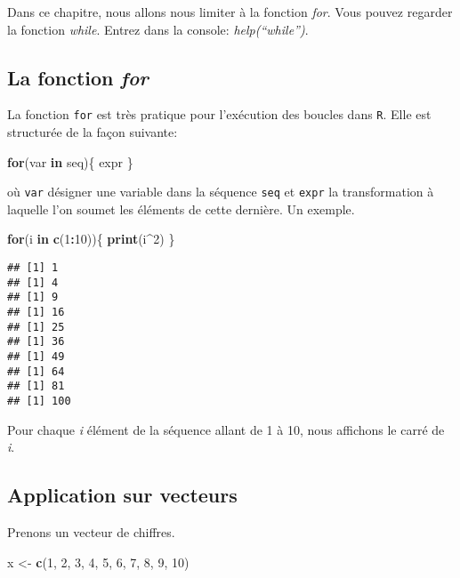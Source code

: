 \documentclass[]{book}
\newenvironment{Shaded}{\begin{snugshade}}{\end{snugshade}}
\newcommand{\KeywordTok}[1]{\textcolor[rgb]{0.13,0.29,0.53}{\textbf{#1}}}
\newcommand{\DecValTok}[1]{\textcolor[rgb]{0.00,0.00,0.81}{#1}}
\newcommand{\StringTok}[1]{\textcolor[rgb]{0.31,0.60,0.02}{#1}}
\newcommand{\ControlFlowTok}[1]{\textcolor[rgb]{0.13,0.29,0.53}{\textbf{#1}}}
\newcommand{\OperatorTok}[1]{\textcolor[rgb]{0.81,0.36,0.00}{\textbf{#1}}}
\newcommand{\NormalTok}[1]{#1}
\begin{document}
Dans ce chapitre, nous allons nous limiter à la fonction \emph{for}.
Vous pouvez regarder la fonction \emph{while}. Entrez dans la console:
\emph{help(``while'')}.

\subsection{\texorpdfstring{La fonction
\emph{for}}{La fonction for}}\label{la-fonction-for}

La fonction \texttt{for} est très pratique pour l'exécution des boucles
dans \texttt{R}. Elle est structurée de la façon suivante:

\begin{Shaded}
\begin{Highlighting}[]
\ControlFlowTok{for}\NormalTok{(var }\ControlFlowTok{in}\NormalTok{ seq)\{}
\NormalTok{  expr}
\NormalTok{\}}
\end{Highlighting}
\end{Shaded}

où \texttt{var} désigner une variable dans la séquence \texttt{seq} et
\texttt{expr} la transformation à laquelle l'on soumet les éléments de
cette dernière. Un exemple.

\begin{Shaded}
\begin{Highlighting}[]
\ControlFlowTok{for}\NormalTok{(i }\ControlFlowTok{in} \KeywordTok{c}\NormalTok{(}\DecValTok{1}\OperatorTok{:}\DecValTok{10}\NormalTok{))\{}
  \KeywordTok{print}\NormalTok{(i}\OperatorTok{^}\DecValTok{2}\NormalTok{)}
\NormalTok{  \}}
\end{Highlighting}
\end{Shaded}

\begin{verbatim}
## [1] 1
## [1] 4
## [1] 9
## [1] 16
## [1] 25
## [1] 36
## [1] 49
## [1] 64
## [1] 81
## [1] 100
\end{verbatim}

Pour chaque \emph{i} élément de la séquence allant de 1 à 10, nous
affichons le carré de \emph{i}.

\subsection{Application sur vecteurs}\label{application-sur-vecteurs}

Prenons un vecteur de chiffres.

\begin{Shaded}
\begin{Highlighting}[]
\NormalTok{x <-}\StringTok{ }\KeywordTok{c}\NormalTok{(}\DecValTok{1}\NormalTok{, }\DecValTok{2}\NormalTok{, }\DecValTok{3}\NormalTok{, }\DecValTok{4}\NormalTok{, }\DecValTok{5}\NormalTok{, }\DecValTok{6}\NormalTok{, }\DecValTok{7}\NormalTok{, }\DecValTok{8}\NormalTok{, }\DecValTok{9}\NormalTok{, }\DecValTok{10}\NormalTok{)}
\end{Highlighting}
\end{Shaded}
\end{document}
